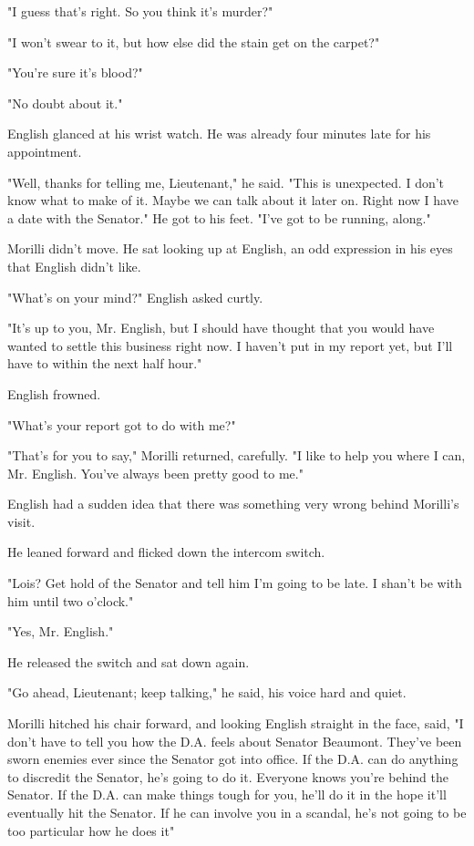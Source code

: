 \documentclass{novel}
\begin{document}
"I guess that's right. So you think it's murder?"

"I won't swear to it, but how else did the stain get on the carpet?"

"You're sure it's blood?"

"No doubt about it."

English glanced at his wrist watch. He was already four minutes late for his appointment.

"Well, thanks for telling me, Lieutenant," he said. "This is unexpected. I don't know what to make of it. Maybe we can talk about it later on. Right now I have a date with the Senator." He got to his feet. "I've got to be running, along."

Morilli didn't move. He sat looking up at English, an odd expression in his eyes that English didn't like.

"What's on your mind?" English asked curtly.

"It's up to you, Mr. English, but I should have thought that you would have wanted to settle this business right now. I haven't put in my report yet, but I'll have to within the next half hour."

English frowned.

"What's your report got to do with me?"

"That's for you to say," Morilli returned, carefully. "I like to help you where I can, Mr. English. You've always been pretty good to me."

English had a sudden idea that there was something very wrong behind Morilli's visit.

He leaned forward and flicked down the intercom switch.

"Lois? Get hold of the Senator and tell him I'm going to be late. I shan't be with him until two o'clock."

"Yes, Mr. English."

He released the switch and sat down again.

"Go ahead, Lieutenant; keep talking," he said, his voice hard and quiet.

Morilli hitched his chair forward, and looking English straight in the face, said, "I don't have to tell you how the D.A. feels about Senator Beaumont. They've been sworn enemies ever since the Senator got into office. If the D.A. can do anything to discredit the Senator, he's going to do it. Everyone knows you're behind the Senator. If the D.A. can make things tough for you, he'll do it in the hope it'll eventually hit the Senator. If he can involve you in a scandal, he's not going to be too particular how he does it"
\end{document}
